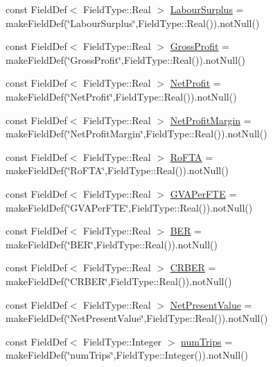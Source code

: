 \begin{DoxyCompactItemize}
\item 
const Field\+Def$<$ Field\+Type\+::\+Real $>$ \mbox{\hyperlink{class_vessels_loglike_table_a7978a471eba2f987bf09b4a0a619baff}{Labour\+Surplus}} = make\+Field\+Def(\char`\"{}Labour\+Surplus\char`\"{},Field\+Type\+::\+Real()).not\+Null()
\item 
const Field\+Def$<$ Field\+Type\+::\+Real $>$ \mbox{\hyperlink{class_vessels_loglike_table_ab63228962ea8d0f6e05cd303a1ac917f}{Gross\+Profit}} = make\+Field\+Def(\char`\"{}Gross\+Profit\char`\"{},Field\+Type\+::\+Real()).not\+Null()
\item 
const Field\+Def$<$ Field\+Type\+::\+Real $>$ \mbox{\hyperlink{class_vessels_loglike_table_a1acddbaae57e81c6783bdad2aa15fcc7}{Net\+Profit}} = make\+Field\+Def(\char`\"{}Net\+Profit\char`\"{},Field\+Type\+::\+Real()).not\+Null()
\item 
const Field\+Def$<$ Field\+Type\+::\+Real $>$ \mbox{\hyperlink{class_vessels_loglike_table_a799bfff8d89ed86514cab6afcea439ba}{Net\+Profit\+Margin}} = make\+Field\+Def(\char`\"{}Net\+Profit\+Margin\char`\"{},Field\+Type\+::\+Real()).not\+Null()
\item 
const Field\+Def$<$ Field\+Type\+::\+Real $>$ \mbox{\hyperlink{class_vessels_loglike_table_a5ebf4708c84bb2b7b79423cd54307096}{Ro\+F\+TA}} = make\+Field\+Def(\char`\"{}Ro\+F\+TA\char`\"{},Field\+Type\+::\+Real()).not\+Null()
\item 
const Field\+Def$<$ Field\+Type\+::\+Real $>$ \mbox{\hyperlink{class_vessels_loglike_table_a1a08f27ef58820a7aa799f9db4502249}{G\+V\+A\+Per\+F\+TE}} = make\+Field\+Def(\char`\"{}G\+V\+A\+Per\+F\+TE\char`\"{},Field\+Type\+::\+Real()).not\+Null()
\item 
const Field\+Def$<$ Field\+Type\+::\+Real $>$ \mbox{\hyperlink{class_vessels_loglike_table_ac8406547831ec1c8ca3adc2d1444b7b6}{B\+ER}} = make\+Field\+Def(\char`\"{}B\+ER\char`\"{},Field\+Type\+::\+Real()).not\+Null()
\item 
const Field\+Def$<$ Field\+Type\+::\+Real $>$ \mbox{\hyperlink{class_vessels_loglike_table_aea98837a0ceb6daf142930950729b2b0}{C\+R\+B\+ER}} = make\+Field\+Def(\char`\"{}C\+R\+B\+ER\char`\"{},Field\+Type\+::\+Real()).not\+Null()
\item 
const Field\+Def$<$ Field\+Type\+::\+Real $>$ \mbox{\hyperlink{class_vessels_loglike_table_a6efdc54b73094d1d6cf0918dd06b833d}{Net\+Present\+Value}} = make\+Field\+Def(\char`\"{}Net\+Present\+Value\char`\"{},Field\+Type\+::\+Real()).not\+Null()
\item 
const Field\+Def$<$ Field\+Type\+::\+Integer $>$ \mbox{\hyperlink{class_vessels_loglike_table_a689980fb5434ada8011dfe67404a1db0}{num\+Trips}} = make\+Field\+Def(\char`\"{}num\+Trips\char`\"{},Field\+Type\+::\+Integer()).not\+Null()
\end{DoxyCompactItemize}


